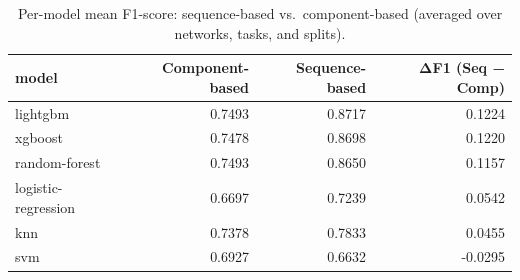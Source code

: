 \begin{table}
\caption{Per-model mean F1-score: sequence-based vs.\ component-based (averaged over networks, tasks, and splits).}
\label{tab:q1_per_model}
\begin{tabular}{lrrr}
\toprule
model & Component-based & Sequence-based & ΔF1 (Seq − Comp) \\
\midrule
lightgbm & 0.7493 & 0.8717 & 0.1224 \\
xgboost & 0.7478 & 0.8698 & 0.1220 \\
random-forest & 0.7493 & 0.8650 & 0.1157 \\
logistic-regression & 0.6697 & 0.7239 & 0.0542 \\
knn & 0.7378 & 0.7833 & 0.0455 \\
svm & 0.6927 & 0.6632 & -0.0295 \\
\bottomrule
\end{tabular}
\end{table}
